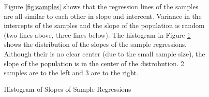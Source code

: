\documentclass{article}
\begin{document}
\begin{figure}[ht]
    \begin{minipage}{0.4\textwidth}
        Figure \ref{fig:samples} shows that the regression lines of the samples
        are all similar to each other in slope and intercent. Variance in the
        intercepts of the samples and the slope of the population is random (two
        lines above, three lines below). The histogram in Figure \ref{fig:hist}
        shows the distribution of the slopes of the sample regressions.
        Although their is no clear center (due to the small sample size), the
        slope of the population is in the center of the distrobution. 2 samples
        are to the left and 3 are to the right.
    \end{minipage}%
    \hspace{0.05\textwidth}
    \begin{minipage}{0.6\textwidth}
        \centering
        \caption{Histogram of Slopes of Sample Regressions}
        \label{fig:hist}
    \end{minipage}
\end{figure}
\end{document}
